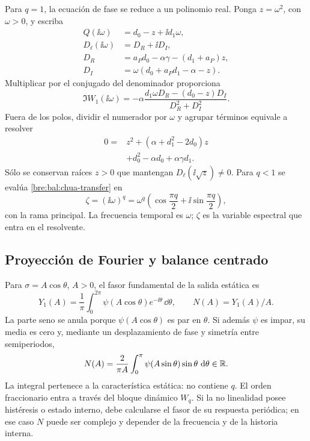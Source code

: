 Para \(q=1\), la ecuación de fase se reduce a un polinomio real.
Ponga \(z=\omega^2\), con \(\omega>0\), y escriba
\begin{equation}
 \begin{aligned}
 Q(\ii\omega)&=d_0-z+\ii d_1\omega,\\
 D_\ell(\ii\omega)&=D_R+\ii D_I,\\
 D_R&=a_Pd_0-\alpha\gamma-(d_1+a_P)z,\\
 D_I&=\omega(d_0+a_Pd_1-\alpha-z).
 \end{aligned}
 \label{bre:bal:phase-parts}
\end{equation}
Multiplicar por el conjugado del denominador proporciona
\begin{equation}
 \Im W_1(\ii\omega)
 =-\alpha\frac{d_1\omega D_R-(d_0-z)D_I}{D_R^2+D_I^2}.
 \label{bre:bal:phase-imag}
\end{equation}
Fuera de los polos, dividir el numerador por \(\omega\) y agrupar
términos equivale a resolver
\begin{equation}
 \begin{aligned}
 0={}&z^2+(\alpha+d_1^2-2d_0)z\\
 &+d_0^2-\alpha d_0+\alpha\gamma d_1.
 \end{aligned}
 \label{bre:bal:phase-polynomial}
\end{equation}
Sólo se conservan raíces \(z>0\) que mantengan
\(D_\ell(\ii\sqrt z)\ne0\). Para \(q<1\) se evalúa
\eqref{bre:bal:chua-transfer} en
\begin{equation}
 \zeta=(\ii\omega)^q
 =\omega^q\left(\cos\frac{\pi q}{2}
       +\ii\sin\frac{\pi q}{2}\right),
 \label{bre:bal:spectral-frequency}
\end{equation}
con la rama principal. La frecuencia temporal es \(\omega\);
\(\zeta\) es la variable espectral que entra en el resolvente.

\subsection{Proyección de Fourier y balance centrado}
\label{bre:bal:df}

Para \(\sigma=A\cos\theta\), \(A>0\), el fasor fundamental de la
salida estática es
\begin{equation}
 Y_1(A)=\frac1\pi\int_0^{2\pi}
 \psi(A\cos\theta)e^{-\ii\theta}\,\dd\theta,
 \qquad N(A)=Y_1(A)/A.
 \label{bre:bal:fourier-df}
\end{equation}
La parte seno se anula porque \(\psi(A\cos\theta)\) es par en
\(\theta\). Si además \(\psi\) es impar, su media es cero y, mediante
un desplazamiento de fase y simetría entre semiperiodos,
\begin{equation}
 N(A)=\frac{2}{\pi A}\int_0^\pi
 \psi(A\sin\theta)\sin\theta\,\,\mathrm d\theta\in\mathbb R.
 \label{bre:bal:df-sine}
\end{equation}
La integral pertenece a la característica estática: no contiene \(q\).
El orden fraccionario entra a través del bloque dinámico \(W_q\).
Si la no linealidad posee histéresis o estado interno, debe calcularse el
fasor de su respuesta periódica; en ese caso \(N\) puede ser complejo
y depender de la frecuencia y de la historia interna.


